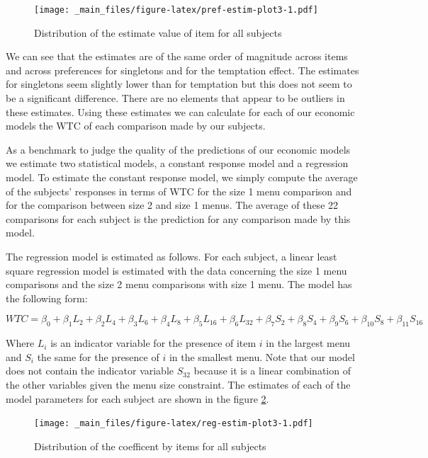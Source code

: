 \documentclass[
]{book}
\begin{document}
\begin{figure}
\centering
\texttt{[image: \_main\_files/figure-latex/pref-estim-plot3-1.pdf]}
\caption{\label{fig:pref-estim-plot3}Distribution of the estimate value of item for all subjects}
\end{figure}

We can see that the estimates are of the same order of magnitude across items
and across preferences for singletons and for the temptation effect.
The estimates for singletons seem slightly lower than for temptation but this
does not seem to be a significant difference.
There are no elements that appear to be outliers in these estimates.
Using these estimates we can calculate for each of our economic models the WTC
of each comparison made by our subjects.

As a benchmark to judge the quality of the predictions of our economic models we
estimate two statistical models, a constant response model and a regression
model.
To estimate the constant response model, we simply compute the average of the
subjects' responses in terms of WTC for the size 1 menu comparison and for the
comparison between size 2 and size 1 menus.
The average of these 22 comparisons for each subject is the prediction for any
comparison made by this model.

The regression model is estimated as follows.
For each subject, a linear least square regression model is estimated with the
data concerning the size 1 menu comparisons and the size 2 menu comparisons with
size 1 menu.
The model has the following form:

\[
WTC = \beta_0 + \beta_1 L_2 + \beta_2 L_4 + \beta_3 L_6 + \beta_4 L_8 + 
\beta_5 L_{16} + \beta_6 L_{32} + 
\beta_7 S_2 + \beta_8 S_4 + \beta_9 S_6 + \beta_{10} S_8 + \beta_{11} S_{16}
\]

Where \(L_i\) is an indicator variable for the presence of item \(i\) in the largest
menu and \(S_i\) the same for the presence of \(i\) in the smallest menu.
Note that our model does not contain the indicator variable \(S_{32}\) because it
is a linear combination of the other variables given the menu size constraint.
The estimates of each of the model parameters for each subject are shown in the
figure \ref{fig:reg-estim-plot3}.

\begin{figure}
\centering
\texttt{[image: \_main\_files/figure-latex/reg-estim-plot3-1.pdf]}
\caption{\label{fig:reg-estim-plot3}Distribution of the coefficent by items for all subjects}
\end{figure}
\end{document}
